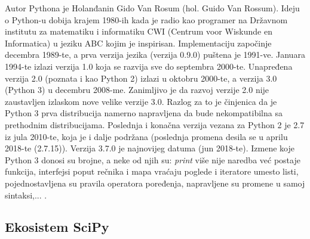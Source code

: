 \documentclass[12pt,oneside]{memoir}
\begin{document}
Autor Pythona je Holanđanin Gido Van Rosum (hol. Guido Van Rossum). Ideju o Python-u dobija krajem 1980-ih kada je radio kao programer na Državnom institutu za matematiku i informatiku CWI (Centrum voor Wiskunde en Informatica) u jeziku ABC kojim je inspirisan. Implementaciju započinje decembra 1989-te, a prva verzija jezika (verzija 0.9.0) puštena je 1991-ve. Januara 1994-te izlazi verzija 1.0 koja se razvija sve do septembra 2000-te. Unapređena verzija 2.0 (poznata i kao Python 2) izlazi u oktobru 2000-te, a verzija 3.0 (Python 3) u decembru 2008-me. Zanimljivo je da razvoj verzije 2.0 nije zaustavljen izlaskom nove velike verzije 3.0. Razlog za to je činjenica da je Python 3 prva distribucija namerno napravljena da bude nekompatibilna sa prethodnim distribucijama. Poslednja i konačna verzija vezana za Python 2 je 2.7 iz jula 2010-te, koja je i dalje podržana (poslednja promena desila se u aprilu 2018-te (2.7.15)). Verzija 3.7.0 je najnovijeg datuma (jun 2018-te). Izmene koje Python 3 donosi su brojne, a neke od njih su: \textit{print} više nije naredba već postaje funkcija, interfejsi poput rečnika i mapa vraćaju poglede i iteratore umesto listi, pojednostavljena su pravila operatora poređenja, napravljene su promene u samoj sintaksi,...  \cite{python-history, python-dates, python-whats-new}.

\subsection{Ekosistem SciPy}
 
\end{document}
